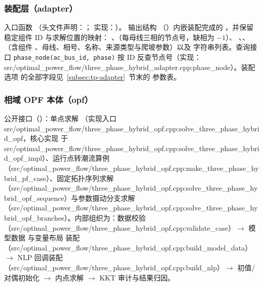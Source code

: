 \subsubsection*{装配层（adapter）}
入口函数 
（头文件声明：；
实现：）。
输出结构 （）内嵌装配完成的
，并保留稳定组件 ID 与求解位置的映射：
、（每母线三相的节点号，缺相为 $-1$）、
、、
（含组件 、母线、相号、名称、来源类型与爬坡参数）以及
 字符串列表。查询接口 \texttt{phase\_node(ac\_bus\_id, phase)}
按 ID 反查节点号（实现：src/optimal\_power\_flow/three\_phase\_hybrid\_adapter.cpp:phase\_node）。装配选项
 的全部字段见~\ref{subsec:tp-adapter}~节末的
参数表。

\subsubsection*{相域 OPF 本体（opf）}
公开接口（）：单点求解 
（实现入口 src/optimal\_power\_flow/three\_phase\_hybrid\_opf.cpp:solve\_three\_phase\_hybrid\_opf，核心实现 
于 src/optimal\_power\_flow/three\_phase\_hybrid\_opf.cpp:solve\_three\_phase\_hybrid\_opf\_impl）、运行点转潮流算例 
（src/optimal\_power\_flow/three\_phase\_hybrid\_opf.cpp:make\_three\_phase\_hybrid\_pf\_case）、固定拓扑序列求解 
（src/optimal\_power\_flow/three\_phase\_hybrid\_opf.cpp:solve\_three\_phase\_hybrid\_opf\_sequence）与参数摄动分支求解 
（src/optimal\_power\_flow/three\_phase\_hybrid\_opf.cpp:solve\_three\_phase\_hybrid\_opf\_branches）。内部组织为：数据校验 
（src/optimal\_power\_flow/three\_phase\_hybrid\_opf.cpp:validate\_case）$\to$ 模型数据  与变量布局 
装配 （src/optimal\_power\_flow/three\_phase\_hybrid\_opf.cpp:build\_model\_data）$\to$ NLP 回调装配
（src/optimal\_power\_flow/three\_phase\_hybrid\_opf.cpp:build\_nlp）$\to$ 初值/对偶初始化 $\to$ 内点求解
$\to$ KKT 审计与结果归因。

